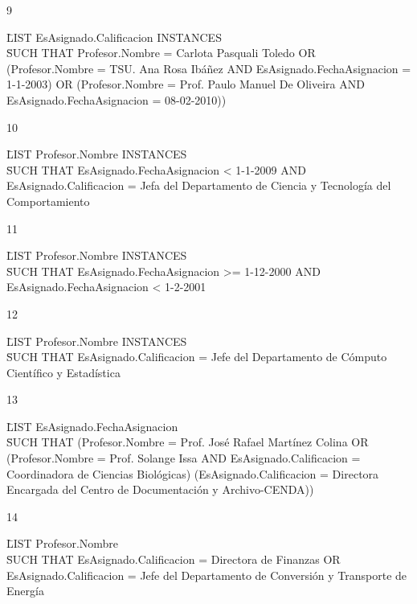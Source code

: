 9

\begin{tabbing}	
\= LIST EsAsignado.Calificacion INSTANCES \\
\= SUCH THAT Profesor.Nombre = Carlota Pasquali Toledo OR \\
(Profesor.Nombre = TSU. Ana Rosa Ibáñez AND EsAsignado.FechaAsignacion = 1-1-2003) OR
(Profesor.Nombre = Prof. Paulo Manuel De Oliveira AND EsAsignado.FechaAsignacion = 08-02-2010))
\end{tabbing}

10

\begin{tabbing}	
\= LIST Profesor.Nombre INSTANCES \\
\= SUCH THAT EsAsignado.FechaAsignacion < 1-1-2009 AND EsAsignado.Calificacion = Jefa del Departamento de Ciencia y Tecnología del Comportamiento \\
\end{tabbing}

11

\begin{tabbing}	
\= LIST Profesor.Nombre INSTANCES \\
\= SUCH THAT EsAsignado.FechaAsignacion >= 1-12-2000 AND EsAsignado.FechaAsignacion < 1-2-2001 \\
\end{tabbing}

12

\begin{tabbing}	
\= LIST Profesor.Nombre INSTANCES \\
\= SUCH THAT EsAsignado.Calificacion = Jefe del Departamento de Cómputo Científico y Estadística \\
\end{tabbing}

13

\begin{tabbing}	
\= LIST EsAsignado.FechaAsignacion \\
\= SUCH THAT (Profesor.Nombre = Prof. José Rafael Martínez Colina OR \\
(Profesor.Nombre = Prof. Solange Issa AND EsAsignado.Calificacion = Coordinadora de Ciencias Biológicas)  
(EsAsignado.Calificacion = Directora Encargada del Centro de Documentación y Archivo-CENDA))
\end{tabbing}

14

\begin{tabbing}	
\= LIST Profesor.Nombre \\
\= SUCH THAT EsAsignado.Calificacion = Directora de Finanzas OR \\
EsAsignado.Calificacion = Jefe del Departamento de Conversión y Transporte de Energía
\end{tabbing}

